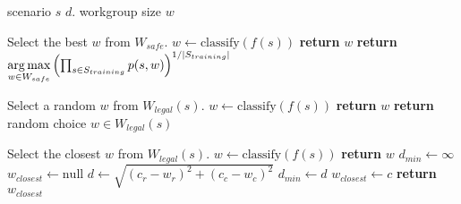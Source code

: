 \begin{algorithmic}[1]
\Require scenario $s$
$d$.
\Ensure workgroup size $w$

\Comment Select the best $w$ from $W_{safe}$.
\State $w \leftarrow \text{classify}(f(s))$
    \State \textbf{return} $w$
\Else
  \State \textbf{return} $\underset{w \in W_{safe}}{\operatorname*{arg\,max}}
\left(
  \prod_{s \in S_{training}} p(s, w)
\right)^{1/|S_{training}|}$
\EndIf
\EndProcedure
\item[] %

\Comment Select a random $w$ from $W_{legal}(s)$.
\State $w \leftarrow \text{classify}(f(s))$
    \State \textbf{return} $w$
\Else
  \State \textbf{return} random choice $w \in W_{legal}(s)$
\EndIf
\EndProcedure
\item[] %

\Comment Select the closest $w$ from $W_{legal}(s)$.
\State $w \leftarrow \text{classify}(f(s))$
    \State \textbf{return} $w$
\Else
  \State $d_{min} \leftarrow \infty$
  \State $w_{closest} \leftarrow \text{null}$
    \State $d \leftarrow \sqrt{\left(c_r - w_r\right)^2 + \left(c_c - w_c\right)^2}$
      \State $d_{min} \leftarrow d$
      \State $w_{closest} \leftarrow c$
    \EndIf
  \EndFor
  \State \textbf{return} $w_{closest}$
\EndIf
\EndProcedure
\end{algorithmic}
